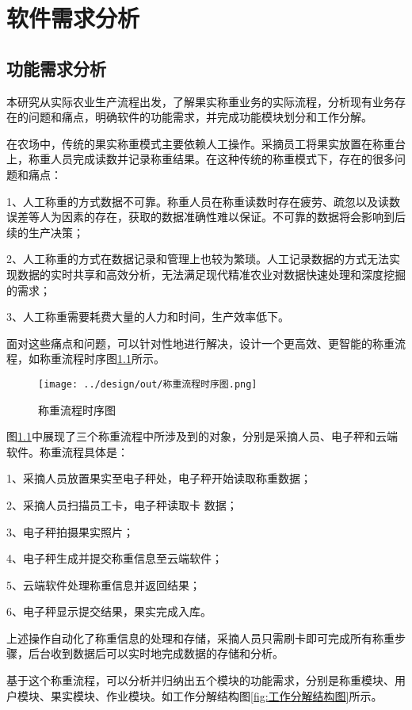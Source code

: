 \chapter{软件需求分析}

\section{功能需求分析}\label{sec:req1}

本研究从实际农业生产流程出发，了解果实称重业务的实际流程，分析现有业务存在的问题和痛点，明确软件的功能需求，并完成功能模块划分和工作分解。

在农场中，传统的果实称重模式主要依赖人工操作。采摘员工将果实放置在称重台上，称重人员完成读数并记录称重结果。在这种传统的称重模式下，存在的很多问题和痛点：

1、人工称重的方式数据不可靠。称重人员在称重读数时存在疲劳、疏忽以及读数误差等人为因素的存在，获取的数据准确性难以保证。不可靠的数据将会影响到后续的生产决策；

2、人工称重的方式在数据记录和管理上也较为繁琐。人工记录数据的方式无法实现数据的实时共享和高效分析，无法满足现代精准农业对数据快速处理和深度挖掘的需求；

3、人工称重需要耗费大量的人力和时间，生产效率低下。

面对这些痛点和问题，可以针对性地进行解决，设计一个更高效、更智能的称重流程，如称重流程时序图\ref{fig:称重流程时序图}所示。

\begin{figure}[H]
    \centering
    \texttt{[image: ../design/out/称重流程时序图.png]}
    \caption{称重流程时序图}
    \label{fig:称重流程时序图}
\end{figure}

图\ref{fig:称重流程时序图}中展现了三个称重流程中所涉及到的对象，分别是采摘人员、电子秤和云端软件。称重流程具体是：

1、采摘人员放置果实至电子秤处，电子秤开始读取称重数据；

2、采摘人员扫描员工卡，电子秤读取卡
数据；

3、电子秤拍摄果实照片；

4、电子秤生成并提交称重信息至云端软件；

5、云端软件处理称重信息并返回结果；

6、电子秤显示提交结果，果实完成入库。

上述操作自动化了称重信息的处理和存储，采摘人员只需刷卡即可完成所有称重步骤，后台收到数据后可以实时地完成数据的存储和分析。

基于这个称重流程，可以分析并归纳出五个模块的功能需求，分别是称重模块、用户模块、果实模块、作业模块。如工作分解结构图\ref{fig:工作分解结构图}所示。

